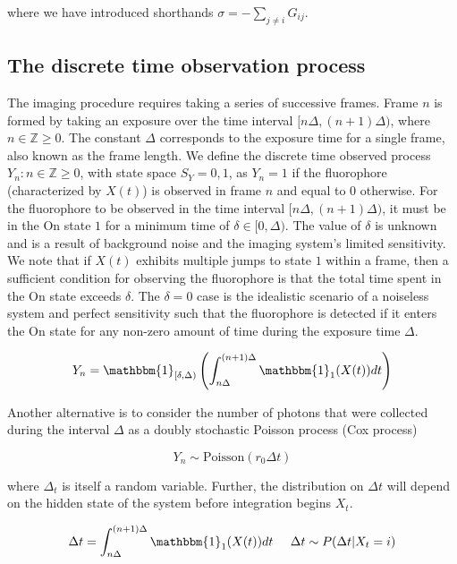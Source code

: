 \documentclass{ucetd}
\begin{document}
where we have introduced shorthands $\sigma = -\sum_{j\neq i}G_{ij}$.

\subsection{The discrete time observation process}

The imaging procedure requires taking a series of successive frames. Frame $n$ is formed by taking an exposure over the time interval $[n\Delta, (n+1)\Delta)$, where $n\in\mathbb{Z}{\geq0}$. The constant $\Delta$ corresponds to the exposure time for a single frame, also known as the frame length. We define the discrete time observed process ${Y_n: n \in \mathbb{Z}{\geq0}}$, with state space $S_Y={0,1}$, as $Y_n=1$ if the fluorophore (characterized by ${X(t)}$) is observed in frame $n$ and equal to $0$ otherwise. For the fluorophore to be observed in the time interval $[n\Delta, (n+1)\Delta)$, it must be in the On state $1$ for a minimum time of $\delta\in[0,\Delta)$. The value of $\delta$ is unknown and is a result of background noise and the imaging system's limited sensitivity. We note that if ${X(t)}$ exhibits multiple jumps to state $1$ within a frame, then a sufficient condition for observing the fluorophore is that the total time spent in the On state exceeds $\delta$. The $\delta=0$ case is the idealistic scenario of a noiseless system and perfect sensitivity such that the fluorophore is detected if it enters the On state for any non-zero amount of time during the exposure time $\Delta$.

\begin{equation*}
Y_{n} = \mathbbm{1}_{[\delta,\Delta)}\left(\int_{n\Delta}^{(n+1)\Delta} \mathbbm{1}_{1} (X(t)) dt\right)
\end{equation*}

Another alternative is to consider the number of photons that were collected during the interval $\Delta$ as a doubly stochastic Poisson process (Cox process)

\begin{equation*}
Y_{n} \sim \mathrm{Poisson}\left(r_{0}\Delta t\right)
\end{equation*}

where $\Delta_{t}$ is itself a random variable. Further, the distribution on $\Delta t$ will depend on the hidden state of the system before integration begins $X_{t}$. 

\begin{equation*}
\Delta t = \int_{n\Delta}^{(n+1)\Delta} \mathbbm{1}_{1} (X(t)) dt \;\;\;\;\;
\Delta t \sim P(\Delta t | X_{t} = i) 
\end{equation*}
\end{document}
